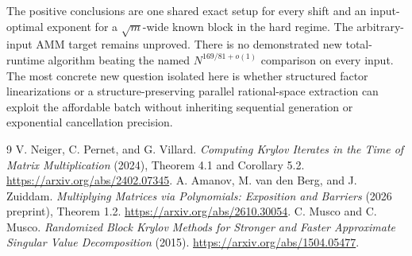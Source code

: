 \documentclass[11pt]{article}
\begin{document}
The positive conclusions are one shared exact setup for every shift and
an input-optimal exponent for a \(\sqrt m\)-wide known block in the
hard regime. The arbitrary-input AMM target remains unproved. There is
no demonstrated new total-runtime algorithm beating the named
\(N^{169/81+o(1)}\) comparison on every input. The most concrete new
question isolated here is whether structured factor linearizations or a
structure-preserving parallel rational-space extraction can exploit the
affordable batch without inheriting sequential generation or exponential
cancellation precision.

\begin{thebibliography}{9}
V. Neiger, C. Pernet, and G. Villard.
\emph{Computing Krylov Iterates in the Time of Matrix Multiplication}
(2024), Theorem 4.1 and Corollary 5.2.
\url{https://arxiv.org/abs/2402.07345}.
A. Amanov, M. van den Berg, and J. Zuiddam.
\emph{Multiplying Matrices via Polynomials: Exposition and Barriers}
(2026 preprint), Theorem 1.2.
\url{https://arxiv.org/abs/2610.30054}.
C. Musco and C. Musco.
\emph{Randomized Block Krylov Methods for Stronger and Faster Approximate
Singular Value Decomposition} (2015).
\url{https://arxiv.org/abs/1504.05477}.
\end{thebibliography}
\end{document}
